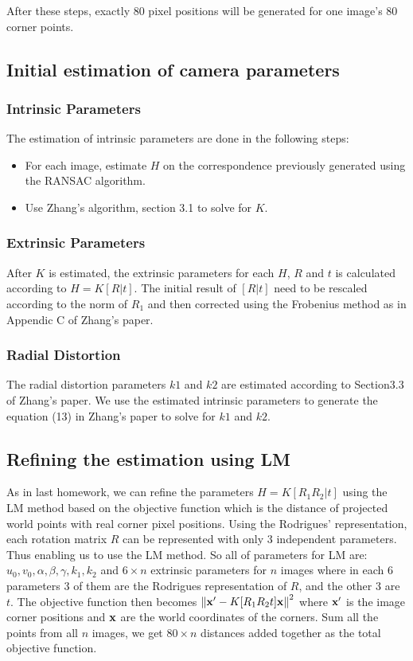 \documentclass[12pt]{article}
\begin{document}
After these steps, exactly 80 pixel positions will be generated for one image's 80 corner points.

\subsection{Initial estimation of camera parameters}
\subsubsection{Intrinsic Parameters}
The estimation of intrinsic parameters are done in the following steps:
\begin{itemize}
\item For each image, estimate $H$ on the correspondence previously generated using the RANSAC algorithm.
\item Use Zhang's algorithm, section 3.1 to solve for $K$.
\end{itemize}

\subsubsection{Extrinsic Parameters}
After $K$ is estimated, the extrinsic parameters for each $H$, $R$ and $t$ is calculated according to
$H=K[R|t]$. The initial result of $[R | t]$ need to be rescaled according to the norm of $R_1$ and then corrected using the Frobenius method as in Appendic C of Zhang's paper.

\subsubsection{Radial Distortion}
The radial distortion parameters $k1$ and $k2$ are estimated according to Section3.3 of Zhang's paper. We use the estimated intrinsic parameters to generate the equation (13) in Zhang's paper to solve for $k1$ and $k2$.

\subsection{Refining the estimation using LM}
As in last homework, we can refine the parameters $H=K[R_1 R_2 |t]$ using the LM method based on the objective function which is the distance of projected world points with real corner pixel positions. Using the Rodrigues' representation, each rotation matrix $R$ can be represented with only 3 independent parameters. Thus enabling us to use the LM method. So all of parameters for LM are: $u_0,v_0,\alpha,\beta,\gamma,k_1,k_2$ and $6\times n$ extrinsic parameters for $n$ images where in each 6 parameters 3 of them are the Rodrigues representation of $R$, and the other 3 are $t$. The objective function then becomes ${\Vert {\bf x}'- K[R_1 R_2 t]{\bf x}\Vert}^2$ where ${\bf x}'$ is the image corner positions and ${\bf x}$ are the world coordinates of the corners. Sum all the points from all $n$ images, we get $80\times n$ distances added together as the total objective function.
\end{document}
